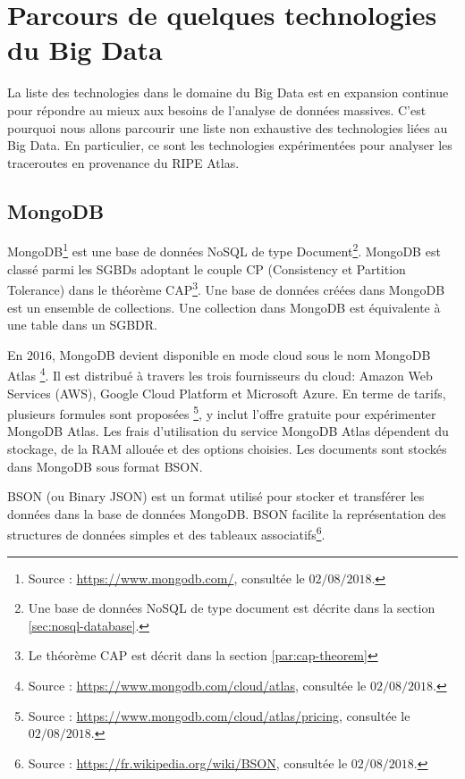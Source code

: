 	\section{Parcours de quelques technologies du Big Data}
La liste des technologies dans le domaine du Big Data est en expansion continue pour répondre au mieux aux besoins de l'analyse de données massives. C'est pourquoi nous allons parcourir une liste non exhaustive des technologies liées au Big Data. En particulier, ce sont les technologies expérimentées pour analyser les traceroutes en provenance du RIPE Atlas.
	
\subsection{MongoDB} \label{subsubsection:mongodb}
MongoDB\footnote{Source : \url{https://www.mongodb.com/}, consultée le $02/08/2018$.} est une base de données  NoSQL de type Document\footnote{Une base de données NoSQL de type document est décrite dans la section \ref{sec:nosql-database}.}.  MongoDB est classé parmi les  SGBDs adoptant le couple CP (Consistency et Partition Tolerance) dans le théorème  CAP\footnote{Le théorème  CAP est décrit dans la section \ref{par:cap-theorem}}. Une base de données créées dans MongoDB est un ensemble de collections. Une collection dans MongoDB est équivalente à une table dans un SGBDR.
	
En $ 2016 $, MongoDB devient disponible en mode cloud sous le nom  MongoDB Atlas \footnote{Source : \url{https://www.mongodb.com/cloud/atlas}, consultée le $ 02/08/2018 $.}.  Il est distribué à travers les trois fournisseurs du cloud: Amazon Web Services (AWS), Google Cloud Platform et Microsoft Azure.  En terme de tarifs, plusieurs formules sont proposées \footnote{Source : \url{https://www.mongodb.com/cloud/atlas/pricing}, consultée le $ 02/08/2018 $.}, y inclut l'offre gratuite pour expérimenter MongoDB Atlas.  Les frais d'utilisation du service MongoDB Atlas dépendent du stockage, de la  RAM allouée et des options choisies. Les documents sont stockés dans MongoDB sous format BSON.
	
\begin{tcolorbox}
	BSON (ou Binary JSON) est un format utilisé pour stocker et transférer les données dans la base de données MongoDB. BSON facilite la représentation des structures de données simples et des tableaux associatifs\footnote{Source : \url{https://fr.wikipedia.org/wiki/BSON}, consultée le $ 02/08/2018 $.}.
\end{tcolorbox}
	
